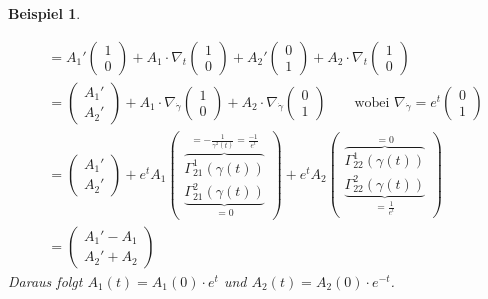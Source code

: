 \documentclass[paper=A4, twoside, chapterprefix=true, bibliography=totoc, headsepline]{scrbook}
\theoremstyle{plain}
\theoremstyle{nonumberplain}
\newtheorem{bsp}{Beispiel}
\theoremstyle{empty}
\theoremstyle{break}
\begin{document}
\begin{bsp}
\begin{enumerate}[label=(\arabic*),leftmargin=*]
\begin{align*}
		&= A_1' \begin{pmatrix} 1 \\ 0 \end{pmatrix} + A_1 \cdot \nabla_t \begin{pmatrix} 1 \\ 0 \end{pmatrix} + A_2' \begin{pmatrix} 0 \\ 1 \end{pmatrix} + A_2 \cdot \nabla_t \begin{pmatrix} 1 \\ 0 \end{pmatrix} \\
		&= \begin{pmatrix} A_1' \\ A_2' \end{pmatrix} + A_1 \cdot \nabla_{\dot\gamma} \begin{pmatrix} 1 \\ 0 \end{pmatrix} + A_2 \cdot \nabla_{\dot\gamma} \begin{pmatrix} 0 \\ 1 \end{pmatrix} \qquad \text{wobei } \nabla_{\dot\gamma}= e^t \begin{pmatrix}0\\1\end{pmatrix} \\
		&= \begin{pmatrix} A_1' \\ A_2' \end{pmatrix} + e^tA_1 \begin{pmatrix} \overbrace{\Gamma_{21}^1(\gamma(t))}^{= - \frac{1}{\gamma^2(t)} = \frac{-1}{e^t}} \\ \underbrace{\Gamma_{21}^2(\gamma(t))}_{=0} \end{pmatrix} + e^t A_2 \begin{pmatrix} \overbrace{\Gamma_{22}^1(\gamma(t))}^{=0} \\ \underbrace{\Gamma_{22}^2(\gamma(t))}_{= \frac{1}{e^t}} \end{pmatrix} \\
		&= \begin{pmatrix} A_1' - A_1 \\ A_2' + A_2 \end{pmatrix}
	\end{align*}
	Daraus folgt $A_1(t) = A_1(0) \cdot e^t$ und $A_2(t) = A_2(0) \cdot e^{-t}$.
\end{enumerate}\end{bsp}
\end{document}
